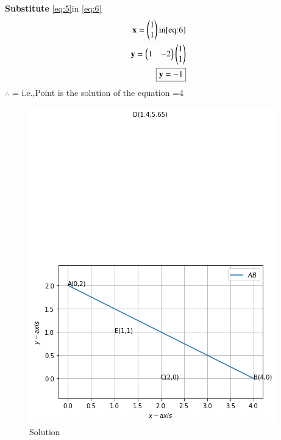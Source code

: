 \documentclass[journal,12pt,twocolumn]{IEEEtran}
\begin{document}
\textbf{Substitute} \eqref{eq:5}in \eqref{eq:6}
\begin{align}
\mathbf{x}=\begin{pmatrix}1\\1\end{pmatrix}\text{in} \eqref{eq:6}\\
          \mathbf{y}=\begin{pmatrix}1&-2\end{pmatrix}\begin{pmatrix}1\\1\end{pmatrix}\\
          \boxed{\mathbf{y}=-1}
\end{align}
$\therefore$ 
= i.e.,Point  is the solution of the equation =4

\begin{figure}[h]
    \centering
    \includegraphics[width=\columnwidth]{download.png}
    \caption{Solution}
    \label{fig:Fig 2.1}
\end{figure}
\end{document}
